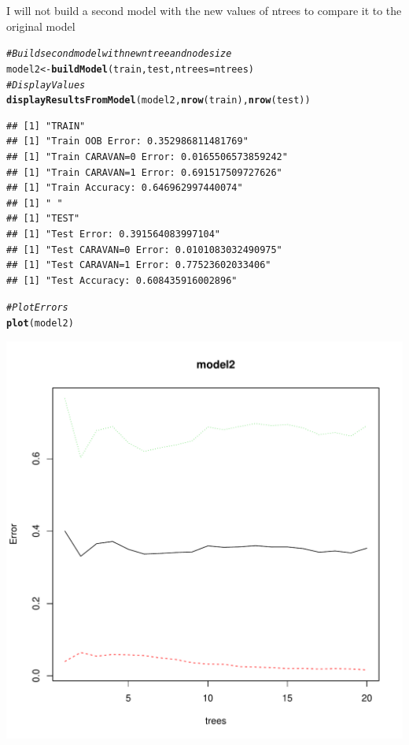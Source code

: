 \documentclass{article}\usepackage[]{graphicx}\usepackage[]{color}
\makeatletter
\def\maxwidth{ %
  \ifdim\Gin@nat@width>\linewidth
    \linewidth
  \else
    \Gin@nat@width
  \fi
}
\newcommand{\hlcom}[1]{\textcolor[rgb]{0.678,0.584,0.686}{\textit{#1}}}%
\newcommand{\hlstd}[1]{\textcolor[rgb]{0.345,0.345,0.345}{#1}}%
\newcommand{\hlkwb}[1]{\textcolor[rgb]{0.69,0.353,0.396}{#1}}%
\newcommand{\hlkwc}[1]{\textcolor[rgb]{0.333,0.667,0.333}{#1}}%
\newcommand{\hlkwd}[1]{\textcolor[rgb]{0.737,0.353,0.396}{\textbf{#1}}}%
\newenvironment{kframe}{%
 \def\at@end@of@kframe{}%
 \ifinner\ifhmode%
  \def\at@end@of@kframe{\end{minipage}}%
  \begin{minipage}{\columnwidth}%
 \fi\fi%
 \def\FrameCommand##1{\hskip\@totalleftmargin \hskip-\fboxsep
 \colorbox{shadecolor}{##1}\hskip-\fboxsep
     \hskip-\linewidth \hskip-\@totalleftmargin \hskip\columnwidth}%
 \MakeFramed {\advance\hsize-\width
   \@totalleftmargin\z@ \linewidth\hsize
   \@setminipage}}%
 {\par\unskip\endMakeFramed%
 \at@end@of@kframe}
\newenvironment{knitrout}{}{} %
\makeatother
\begin{document}
I will not build a second model with the new values of ntrees to compare it to the original model
\begin{knitrout}
\color{fgcolor}\begin{kframe}
\begin{alltt}
\hlcom{#Build second model with new ntree and nodesize}
\hlstd{model2}\hlkwb{<-}\hlkwd{buildModel}\hlstd{(train,test,}\hlkwc{ntrees}\hlstd{=ntrees)}
\hlcom{#Display Values}
\hlkwd{displayResultsFromModel}\hlstd{(model2,}\hlkwd{nrow}\hlstd{(train),}\hlkwd{nrow}\hlstd{(test))}
\end{alltt}
\begin{verbatim}
## [1] "TRAIN"
## [1] "Train OOB Error: 0.352986811481769"
## [1] "Train CARAVAN=0 Error: 0.0165506573859242"
## [1] "Train CARAVAN=1 Error: 0.691517509727626"
## [1] "Train Accuracy: 0.646962997440074"
## [1] " "
## [1] "TEST"
## [1] "Test Error: 0.391564083997104"
## [1] "Test CARAVAN=0 Error: 0.0101083032490975"
## [1] "Test CARAVAN=1 Error: 0.77523602033406"
## [1] "Test Accuracy: 0.608435916002896"
\end{verbatim}
\begin{alltt}
\hlcom{#Plot Errors}
\hlkwd{plot}\hlstd{(model2)}
\end{alltt}
\end{kframe}
\includegraphics[width=\maxwidth]{figure/unnamed-chunk-34-1} 

\end{knitrout}
\end{document}
